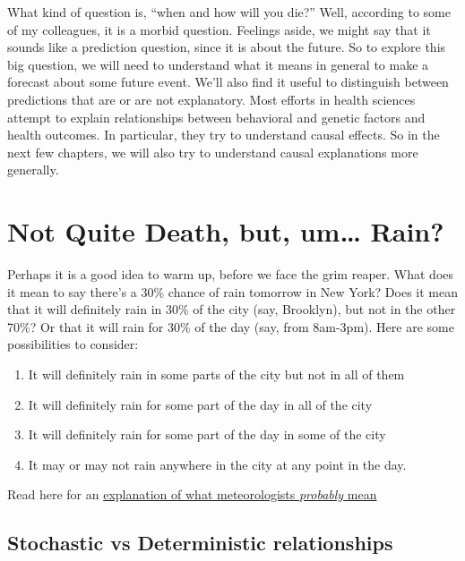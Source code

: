 \documentclass[
  openany]{book}
\providecommand{\tightlist}{%
  \setlength{\itemsep}{0pt}\setlength{\parskip}{0pt}}
\begin{document}
What kind of question is, ``when and how will you die?'' Well, according to some of my colleagues, it is a morbid question. Feelings aside, we might say that it sounds like a prediction question, since it is about the future. So to explore this big question, we will need to understand what it means in general to make a forecast about some future event. We'll also find it useful to distinguish between predictions that are or are not explanatory. Most efforts in health sciences attempt to explain relationships between behavioral and genetic factors and health outcomes. In particular, they try to understand causal effects. So in the next few chapters, we will also try to understand causal explanations more generally.

\hypertarget{not-quite-death-but-um-rain}{%
\section*{Not Quite Death, but, um\ldots{} Rain?}\label{not-quite-death-but-um-rain}}

Perhaps it is a good idea to warm up, before we face the grim reaper. What does it mean to say there's a 30\% chance of rain tomorrow in New York? Does it mean that it will definitely rain in 30\% of the city (say, Brooklyn), but not in the other 70\%? Or that it will rain for 30\% of the day (say, from 8am-3pm). Here are some possibilities to consider:

\begin{enumerate}
\def\labelenumi{\alph{enumi})}
\tightlist
\item
  It will definitely rain in some parts of the city but not in all of them
\item
  It will definitely rain for some part of the day in all of the city
\item
  It will definitely rain for some part of the day in some of the city
\item
  It may or may not rain anywhere in the city at any point in the day.
\end{enumerate}

Read here for an \href{http://wxbrad.com/why-a-50-chance-of-rain-usually-means-a-100-chance-of-confusion/}{explanation of what meteorologists \emph{probably} mean}

\hypertarget{stochastic-vs-deterministic-relationships}{%
\subsection*{Stochastic vs Deterministic relationships}\label{stochastic-vs-deterministic-relationships}}
\end{document}
